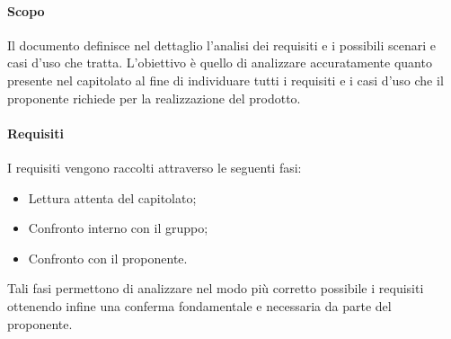 \paragraph{Scopo}
Il documento \docNameAdR{} definisce nel dettaglio l'analisi dei requisiti e i possibili scenari e casi d'uso che tratta. L'obiettivo è quello di analizzare accuratamente quanto presente nel capitolato al fine di individuare tutti i requisiti e i casi d'uso che il proponente richiede per la realizzazione del prodotto.

\paragraph{Requisiti}
I requisiti vengono raccolti attraverso le seguenti fasi:
\begin{itemize}
\item Lettura attenta del capitolato;
\item Confronto interno con il gruppo;
\item Confronto con il proponente.
\end{itemize}
Tali fasi permettono di analizzare nel modo più corretto possibile i requisiti ottenendo infine una conferma fondamentale e necessaria da parte del proponente.

